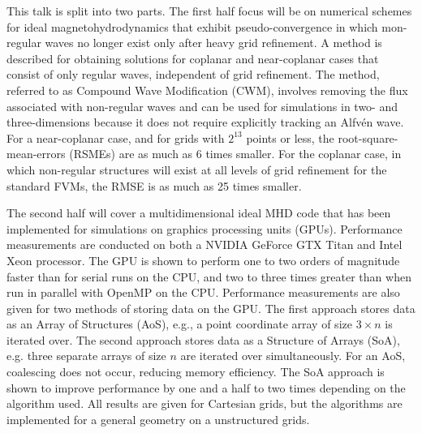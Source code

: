 This talk is split into two parts.  The first half focus will be on numerical schemes for ideal magnetohydrodynamics that exhibit pseudo-convergence in which mon-regular waves no longer exist only after heavy grid refinement.  A method is described for obtaining solutions for coplanar and near-coplanar cases that consist of only regular waves, independent of grid refinement.  The method, referred to as Compound Wave Modification (CWM), involves removing the flux associated with non-regular waves and can be used for simulations in two- and three-dimensions because it does not require explicitly tracking an Alfv{\'e}n wave.  For a near-coplanar case, and for grids with $2^{13}$ points or less, the root-square-mean-errors (RSMEs) are as much as 6 times smaller.  For the coplanar case, in which non-regular structures will exist at all levels of grid refinement for the standard FVMs, the RMSE is as much as 25 times smaller.  
 
The second half will cover a multidimensional ideal MHD code that has been implemented for simulations on graphics processing units (GPUs).  Performance measurements are conducted on both a NVIDIA GeForce GTX Titan and Intel Xeon processor. The GPU is shown to perform one to two orders of magnitude faster than for serial runs on the CPU, and two to three times greater than when run in parallel with OpenMP on the CPU.  Performance measurements are also given for two methods of storing data on the GPU.  The first approach stores data as an Array of Structures (AoS), e.g., a point coordinate array of size $3\times n$ is iterated over.  The second approach stores data as a Structure of Arrays (SoA), e.g. three separate arrays of size $n$ are iterated over simultaneously.  For an AoS, coalescing does not occur, reducing memory efficiency.  The SoA approach is shown to improve performance by one and a half to two times depending on the algorithm used.  All results are given for Cartesian grids, but the algorithms are implemented for a general geometry on a unstructured grids.

